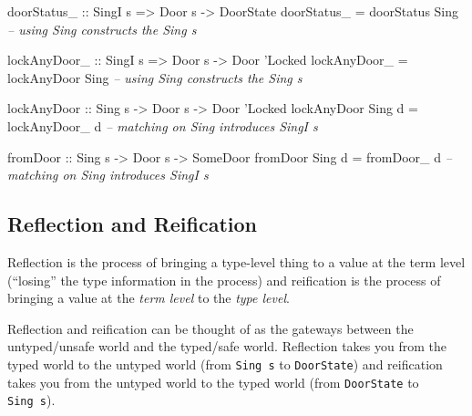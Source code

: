 \documentclass[]{article}
\newenvironment{Shaded}{}{}
\newcommand{\CommentTok}[1]{\textcolor[rgb]{0.38,0.63,0.69}{\textit{#1}}}
\newcommand{\DataTypeTok}[1]{\textcolor[rgb]{0.56,0.13,0.00}{#1}}
\newcommand{\FunctionTok}[1]{\textcolor[rgb]{0.02,0.16,0.49}{#1}}
\newcommand{\NormalTok}[1]{#1}
\newcommand{\OtherTok}[1]{\textcolor[rgb]{0.00,0.44,0.13}{#1}}
\begin{document}
\begin{Shaded}
\begin{Highlighting}[]
\OtherTok{doorStatus_ ::} \DataTypeTok{SingI}\NormalTok{ s }\OtherTok{=>} \DataTypeTok{Door}\NormalTok{ s }\OtherTok{->} \DataTypeTok{DoorState}
\NormalTok{doorStatus_ }\FunctionTok{=}\NormalTok{ doorStatus }\DataTypeTok{Sing}           \CommentTok{-- using Sing constructs the Sing s}

\OtherTok{lockAnyDoor_ ::} \DataTypeTok{SingI}\NormalTok{ s }\OtherTok{=>} \DataTypeTok{Door}\NormalTok{ s }\OtherTok{->} \DataTypeTok{Door}\NormalTok{ '}\DataTypeTok{Locked}
\NormalTok{lockAnyDoor_ }\FunctionTok{=}\NormalTok{ lockAnyDoor }\DataTypeTok{Sing}         \CommentTok{-- using Sing constructs the Sing s}

\OtherTok{lockAnyDoor ::} \DataTypeTok{Sing}\NormalTok{ s }\OtherTok{->} \DataTypeTok{Door}\NormalTok{ s }\OtherTok{->} \DataTypeTok{Door}\NormalTok{ '}\DataTypeTok{Locked}
\NormalTok{lockAnyDoor }\DataTypeTok{Sing}\NormalTok{ d }\FunctionTok{=}\NormalTok{ lockAnyDoor_ d     }\CommentTok{-- matching on Sing introduces SingI s}

\OtherTok{fromDoor ::} \DataTypeTok{Sing}\NormalTok{ s }\OtherTok{->} \DataTypeTok{Door}\NormalTok{ s }\OtherTok{->} \DataTypeTok{SomeDoor}
\NormalTok{fromDoor }\DataTypeTok{Sing}\NormalTok{ d }\FunctionTok{=}\NormalTok{ fromDoor_ d           }\CommentTok{-- matching on Sing introduces SingI s}
\end{Highlighting}
\end{Shaded}

\hypertarget{reflection-and-reification}{%
\subsection{Reflection and Reification}\label{reflection-and-reification}}

Reflection is the process of bringing a type-level thing to a value at the term
level (``losing'' the type information in the process) and reification is the
process of bringing a value at the \emph{term level} to the \emph{type level}.

Reflection and reification can be thought of as the gateways between the
untyped/unsafe world and the typed/safe world. Reflection takes you from the
typed world to the untyped world (from \texttt{Sing\ s} to \texttt{DoorState})
and reification takes you from the untyped world to the typed world (from
\texttt{DoorState} to \texttt{Sing\ s}).
\end{document}

